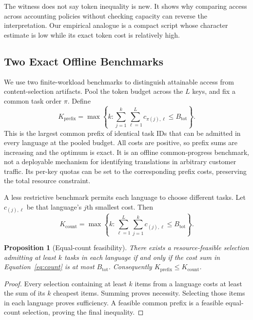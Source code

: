 \documentclass[manuscript,screen]{acmart}
\newtheorem{proposition}{Proposition}
\begin{document}
The witness does not say token inequality is new. It shows why comparing access across accounting policies without checking capacity can reverse the interpretation. Our empirical analogue is a compact script whose character estimate is low while its exact token cost is relatively high.

\subsection{Two Exact Offline Benchmarks}
We use two finite-workload benchmarks to distinguish attainable access from content-selection artifacts. Pool the token budget across the $L$ keys, and fix a common task order $\pi$. Define
\begin{equation}
K_{\mathrm{prefix}}=\max\left\{k:\sum_{j=1}^k\sum_{\ell=1}^L c_{\pi(j),\ell}\leq B_{\mathrm{tot}}\right\}.\label{eq:prefix}
\end{equation}
This is the largest common prefix of identical task IDs that can be admitted in every language at the pooled budget. All costs are positive, so prefix sums are increasing and the optimum is exact. It is an offline common-progress benchmark, not a deployable mechanism for identifying translations in arbitrary customer traffic. Its per-key quotas can be set to the corresponding prefix costs, preserving the total resource constraint.

A less restrictive benchmark permits each language to choose different tasks. Let $c_{(j),\ell}$ be that language's $j$th smallest cost. Then
\begin{equation}
K_{\mathrm{count}}=\max\left\{k:\sum_{\ell=1}^L\sum_{j=1}^k c_{(j),\ell}\leq B_{\mathrm{tot}}\right\}.\label{eq:count}
\end{equation}
\begin{proposition}[Equal-count feasibility]\label{prop:frontier}
There exists a resource-feasible selection admitting at least $k$ tasks in each language if and only if the cost sum in Equation~\eqref{eq:count} is at most $B_{\mathrm{tot}}$. Consequently $K_{\mathrm{prefix}}\leq K_{\mathrm{count}}$.
\end{proposition}
\begin{proof}
Every selection containing at least $k$ items from a language costs at least the sum of its $k$ cheapest items. Summing proves necessity. Selecting those items in each language proves sufficiency. A feasible common prefix is a feasible equal-count selection, proving the final inequality.
\end{proof}
\end{document}
